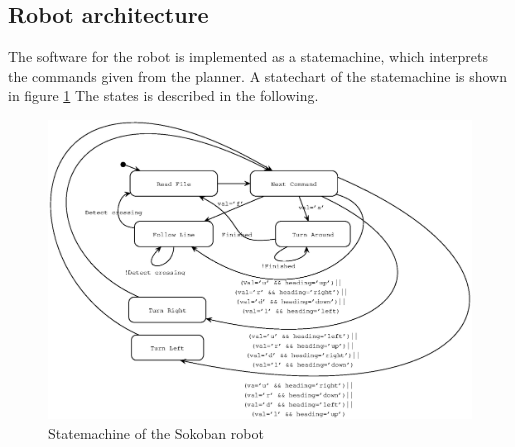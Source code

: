 \documentclass[final, english, a4paper]{article}
\begin{document}
	\subsection{Robot architecture}
	    The software for the robot is implemented as a statemachine, which
	    interprets the commands given from the planner.
	    A statechart of the statemachine is shown in figure \ref{fig:RobotStateChart}
	    The states is described in the following.
	    \begin{figure}[htp]
            \centering
    	    \includegraphics[scale=0.6]{TopLevelStateChart}
	        \caption{Statemachine of the Sokoban robot}\label{fig:RobotStateChart}
        \end{figure}
        \FloatBarrier
\end{document}
